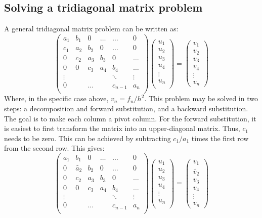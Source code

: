 \documentclass[a4paper, 10pt]{article}
\begin{document}
\subsection*{Solving a tridiagonal matrix problem}
A general tridiagonal matrix problem can be written as:
$$\begin{pmatrix}
a_{1} & b_1 & 0 & \ldots &  \ldots & 0\\
c_1 & a_2 & b_2  & 0 & \ldots & 0\\
0 & c_2 & a_3 &b_3 & 0 & \ldots \\
0 & 0 & c_3 & a_4 &b_4 &\ldots\\
\vdots &  & &  &\ddots & \vdots \\
0 && \ldots && c_{n-1}&  a_n  \\
\end{pmatrix}\begin{pmatrix}
u_1\\
u_2\\
u_3\\
u_4\\
\vdots\\
u_n\\
\end{pmatrix}=\begin{pmatrix}
v_1\\
v_2\\
v_3\\
v_4\\
\vdots\\
v_n
\end{pmatrix}$$
Where, in the specific case above, $v_n=f_n/h^2$. This problem may be solved in two steps: a decomposition and forward substitution, and a backward substitution. The goal is to make each column a pivot column. For the forward substitution, it is easiest to first transform the matrix into an upper-diagonal matrix. Thus, $c_1$ needs to be zero. This can be achieved by subtracting $c_1/a_1$ times the first row from the second row. This gives:
$$\begin{pmatrix}
a_{1} & b_1 & 0 & \ldots &  \ldots & 0\\
0 & \tilde{a_2} & b_2  & 0 & \ldots & 0\\
0 & c_2 & a_3 &b_3 & 0 & \ldots \\
0 & 0 & c_3 & a_4 &b_4 &\ldots\\
\vdots &  & &  &\ddots & \vdots \\
0 && \ldots && c_{n-1}&  a_n  \\
\end{pmatrix}\begin{pmatrix}
u_1\\
u_2\\
u_3\\
u_4\\
\vdots\\
u_n\\
\end{pmatrix}=\begin{pmatrix}
v_1\\
\tilde{v_2}\\
v_3\\
v_4\\
\vdots\\
v_n
\end{pmatrix}$$
\end{document}
